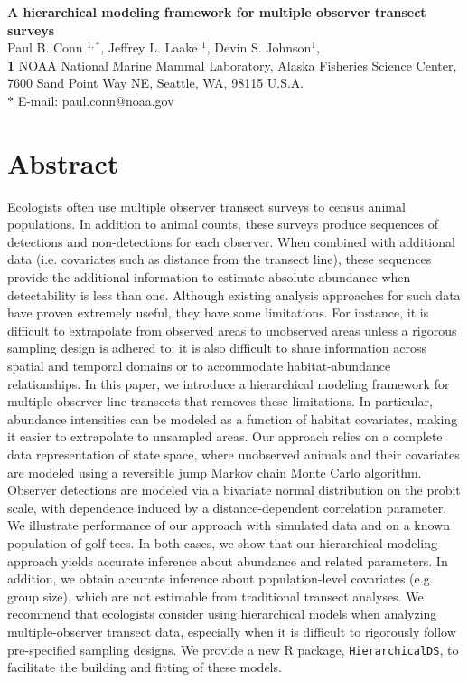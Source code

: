 \documentclass[10pt]{article}
\date{}
\begin{document}
\begin{flushleft}
{\Large
\textbf{A hierarchical modeling framework for multiple observer transect surveys} }
\\
Paul B. Conn $^{1,\ast}$,
Jeffrey L. Laake $^{1}$,
Devin S. Johnson$^{1}$,
\\
{\bf{1}} NOAA National Marine Mammal Laboratory, Alaska Fisheries Science Center,
7600 Sand Point Way NE, Seattle, WA, 98115 U.S.A.
\\
$\ast$ E-mail: paul.conn@noaa.gov
\end{flushleft}

\section*{Abstract}
Ecologists often use multiple observer transect surveys to census animal populations.  In addition to animal counts, these surveys produce sequences of detections and non-detections for each observer.  When combined with additional data (i.e. covariates such as distance from the transect line), these sequences provide the additional information to estimate absolute abundance when detectability is less than one.  Although existing analysis approaches for such data have proven extremely useful, they have some limitations.  For instance, it is difficult to extrapolate from observed areas to unobserved areas unless a rigorous sampling design is adhered to; it is also difficult to share information across spatial and temporal domains or to accommodate habitat-abundance relationships.  In this paper, we introduce a hierarchical modeling framework for multiple observer line transects that removes these limitations.  In particular, abundance intensities can be modeled as a function of habitat covariates, making it easier to extrapolate to unsampled areas.  Our approach relies on a complete data representation of state space, where unobserved animals and their covariates are modeled using a reversible jump Markov chain Monte Carlo algorithm.  Observer detections are modeled via a bivariate normal distribution on the probit scale, with dependence induced by a distance-dependent correlation parameter.  We illustrate performance of our approach with simulated data and on a known population of golf tees.  In both cases, we show that our hierarchical modeling approach yields accurate inference about abundance and related parameters.  In addition, we obtain accurate inference about population-level covariates (e.g. group size), which are not estimable from traditional transect analyses.  We recommend that ecologists consider using hierarchical models when analyzing multiple-observer transect data, especially when it is difficult to rigorously follow pre-specified sampling designs.  We provide a new R package, {\tt HierarchicalDS}, to facilitate the building and fitting of these models.
\end{document}
